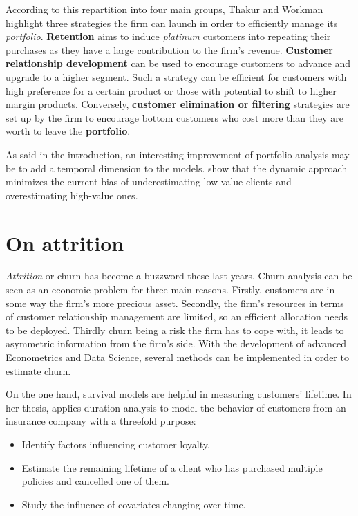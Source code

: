 \documentclass[
]{book}
\providecommand{\tightlist}{%
  \setlength{\itemsep}{0pt}\setlength{\parskip}{0pt}}
\begin{document}
According to this repartition into four main groups, Thakur and Workman highlight three strategies the firm can launch in order to efficiently manage its \emph{portfolio}. \textbf{Retention} aims to induce \emph{platinum} customers into repeating their purchases as they have a large contribution to the firm's revenue. \textbf{Customer relationship development} can be used to encourage customers to advance and upgrade to a higher segment. Such a strategy can be efficient for customers with high preference for a certain product or those with potential to shift to higher margin products. Conversely, \textbf{customer elimination or filtering} strategies are set up by the firm to encourage bottom customers who cost more than they are worth to leave the \textbf{portfolio}.

As said in the introduction, an interesting improvement of portfolio analysis may be to add a temporal dimension to the models. \citet{MANAGING_DYNAMICS_CUSTOMER_PORTFOLIO} show that the dynamic approach minimizes the current bias of underestimating low-value clients and overestimating high-value ones.

\hypertarget{attrition}{%
\section{On attrition}\label{attrition}}

\emph{Attrition} or churn has become a buzzword these last years. Churn analysis can be seen as an economic problem for three main reasons. Firstly, customers are in some way the firm's more precious asset. Secondly, the firm's resources in terms of customer relationship management are limited, so an efficient allocation needs to be deployed. Thirdly churn being a risk the firm has to cope with, it leads to asymmetric information from the firm's side. With the development of advanced Econometrics and Data Science, several methods can be implemented in order to estimate churn.

On the one hand, survival models are helpful in measuring customers' lifetime. In her thesis, \citet{SURV_METHODS_INSURANCE} applies duration analysis to model the behavior of customers from an insurance company with a threefold purpose:

\begin{itemize}
\tightlist
\item
  Identify factors influencing customer loyalty.
\item
  Estimate the remaining lifetime of a client who has purchased multiple policies and cancelled one of them.
\item
  Study the influence of covariates changing over time.
\end{itemize}
\end{document}
